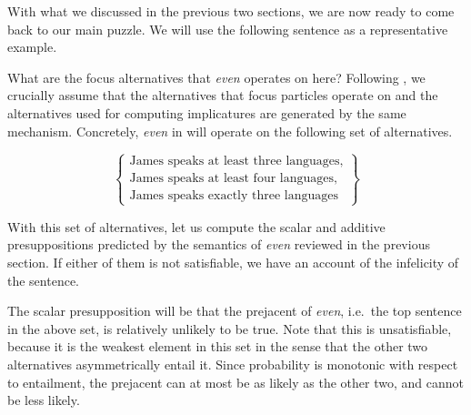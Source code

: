 \documentclass[output=paper]{langscibook}
\begin{document}
With what we discussed in the previous two sections, we are now ready to come back to our main puzzle. We will use the following sentence as a representative example.

    \z

\noindent What are the focus alternatives that \textit{even} operates on here? Following \citet{foxkatzir}, we crucially assume that the alternatives that focus particles operate on and the alternatives used for computing implicatures are generated by the same mechanism. Concretely, \textit{even} in  will operate on the following set of alternatives.

  \[\left\{\begin{array}{l}
    \text{James speaks at least three languages,}\\
    \text{James speaks {at least four} languages,}\\
    \text{James speaks {exactly three} languages}
  \end{array}\right\}\]

\noindent With this set of alternatives, let us compute the scalar and additive presuppositions predicted by the semantics of \textit{even} reviewed in the previous section. If either of them is not satisfiable, we have an account of the infelicity of the sentence.

The scalar presupposition will be that the prejacent of \textit{even}, i.e.\ the top sentence in the above set, is relatively unlikely to be true. Note that this is unsatisfiable, because it is the weakest element in this set in the sense that the other two alternatives asymmetrically entail it. Since probability is monotonic with respect to entailment, the prejacent can at most be as likely as the other two, and cannot be less likely.
\end{document}

